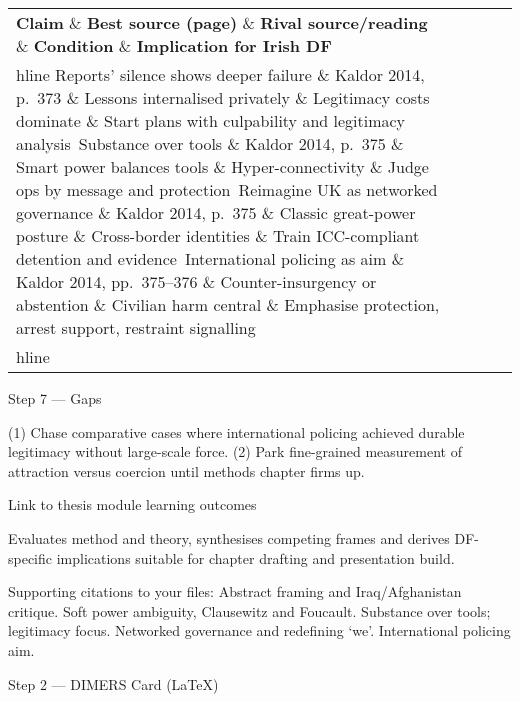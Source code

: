  
\begin{tabular}{p{3.2cm}p{4.2cm}p{3.6cm}p{3.2cm}p{4.2cm}}
	\textbf{Claim} \& \textbf{Best source (page)} \& \textbf{Rival source/reading} \& \textbf{Condition} \& \textbf{Implication for Irish DF}\\hline
	Reports’ silence shows deeper failure \& Kaldor 2014, p.~373 \& Lessons internalised privately \& Legitimacy costs dominate \& Start plans with culpability and legitimacy analysis\
	Substance over tools \& Kaldor 2014, p.~375 \& Smart power balances tools \& Hyper-connectivity \& Judge ops by message and protection\
	Reimagine UK as networked governance \& Kaldor 2014, p.~375 \& Classic great-power posture \& Cross-border identities \& Train ICC-compliant detention and evidence\
	International policing as aim \& Kaldor 2014, pp.~375–376 \& Counter-insurgency or abstention \& Civilian harm central \& Emphasise protection, arrest support, restraint signalling\\hline
\end{tabular}

Step 7 — Gaps

(1) Chase comparative cases where international policing achieved durable legitimacy without large-scale force.
(2) Park fine-grained measurement of attraction versus coercion until methods chapter firms up.

Link to thesis module learning outcomes

Evaluates method and theory, synthesises competing frames and derives DF-specific implications suitable for chapter drafting and presentation build.

Supporting citations to your files:
Abstract framing and Iraq/Afghanistan critique.
Soft power ambiguity, Clausewitz and Foucault.
Substance over tools; legitimacy focus.
Networked governance and redefining ‘we’.
International policing aim.

\parencite{RANGELOV_2012}

Step 2 — DIMERS Card (LaTeX)


